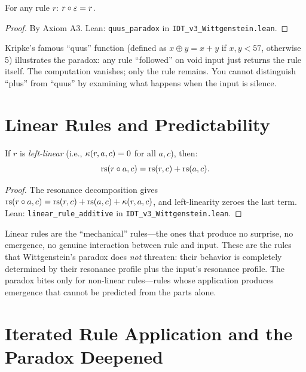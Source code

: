\begin{theorem}
\label{thm:quus}
For any rule $r$: $r \circ \varepsilon = r$.
\end{theorem}

\begin{proof}
By Axiom A3.
Lean: \texttt{quus\_paradox} in \texttt{IDT\_v3\_Wittgenstein.lean}.
\end{proof}

\begin{interpretation}
Kripke's famous ``quus'' function (defined as $x \oplus y = x + y$ if
$x, y < 57$, otherwise 5) illustrates the paradox: any rule ``followed''
on void input just returns the rule itself. The computation vanishes; only
the rule remains. You cannot distinguish ``plus'' from ``quus'' by examining
what happens when the input is silence.
\end{interpretation}

\section{Linear Rules and Predictability}

\begin{theorem}
\label{thm:linear-predictable}
If $r$ is \emph{left-linear} (i.e., $\kappa(r, a, c) = 0$ for all $a, c$),
then:
\[
\mathrm{rs}(r \circ a, c) = \mathrm{rs}(r, c) + \mathrm{rs}(a, c).
\]
\end{theorem}

\begin{proof}
The resonance decomposition gives $\mathrm{rs}(r \circ a, c) = \mathrm{rs}(r,c) + \mathrm{rs}(a,c) + \kappa(r,a,c)$, and left-linearity zeroes the last term.
Lean: \texttt{linear\_rule\_additive} in \texttt{IDT\_v3\_Wittgenstein.lean}.
\end{proof}

\begin{interpretation}
Linear rules are the ``mechanical'' rules---the ones that produce no surprise,
no emergence, no genuine interaction between rule and input. These are the
rules that Wittgenstein's paradox does \emph{not} threaten: their behavior is
completely determined by their resonance profile plus the input's resonance
profile. The paradox bites only for non-linear rules---rules whose application
produces emergence that cannot be predicted from the parts alone.
\end{interpretation}

\section{Iterated Rule Application and the Paradox Deepened}

